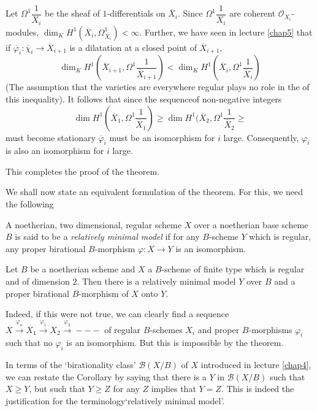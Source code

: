  Let $\Omega^1 \dfrac{1}{X_i}$ be the sheaf of $1$-differentials on
 $\bar{X}_i$. Since $\Omega^1 \dfrac{1}{X_i}$ are coherent
 $\mathscr{O}_{X_i}$-modules, $\dim_K H^1 (\overline{X}_i,
 \Omega^1_{\overline{X}_i}) < \infty $. Further, we have seen in lecture
 \ref{chap5} that if $\overline{\varphi}_i : \overline{\chi}_i \rightarrow
 \overline{X}_{i+1}$  is a dilatation at a closed point of
 $\overline{X}_{i+1}$, 
 $$
 \dim_K H^1(\overline{X}_{i+1},\Omega^1 \frac{1}{\overline{X}_{i+1}}) <
 \dim_K H^1 (\overline{X}_{i}, \Omega^1 \frac{1}{\overline{X}_i})  
 $$
 (The assumption that the varieties are everywhere regular plays no
 role in the of this inequality). It follows that since the
 sequence\pageoriginale  of non-negative integers  
 $$
 \dim H^1(\overline{X}_{1},\Omega^1 \frac{1}{\overline{X}_1}) \ge \dim H^1
 (\overline{X}_{2},\Omega^1 \frac{1}{\overline{X}_2} \ge  
 $$
must become stationary $\overline{\varphi}_i$ must be an isomorphism
for $i$ large. Consequently, $\varphi_i$ is also an isomorphism for
$i$ large. 

This completes the proof of the theorem.

We shall now state an equivalent formulation of the theorem. For this,
we need the following  

\begin{defi*}%
  A noetherian, two dimensional, regular scheme $X$ over a noetherian
  base scheme $B$ is said to be  a \textit{relatively minimal model}
  if for any $B$-scheme $Y$ which is regular, any proper birational
  $B$-morphism $\varphi : X \to Y$ is an isomorphism. 
\end{defi*}

\begin{coro*}%
  Let $B$ be a noetherian scheme and $X$ a $B$-scheme of finite type
  which is regular and of dimension $2$. Then there is a relatively
  minimal model $Y$ over $B$ and a proper birational $B$-morphism of $X$
  onto $Y$. 
\end{coro*}

Indeed, if this  were not true, we can clearly find a sequence $X
\xrightarrow{\varphi_o} X_1 \xrightarrow{\varphi_1} X_2
\xrightarrow{\varphi_2} ---$ of regular $B$-schemes  $X_i$ and proper
$B$-morphisms $\varphi_i$ such that no $\varphi_i$ is an
isomorphism. But this is impossible by the theorem. 

In terms of the `birationality class' $\mathscr{B} (X/B)$ of $X$
introduced in lecture \ref{chap4}, we can restate the Corollary by saying that
there is a $Y$ in $\mathscr{B} (X/B)$ such that $X \ge Y$, but
such that $Y \ge Z$ for any $Z$ implies that $Y = Z$. This is indeed
the justification for the terminology\pageoriginale `relatively
minimal model'.  

